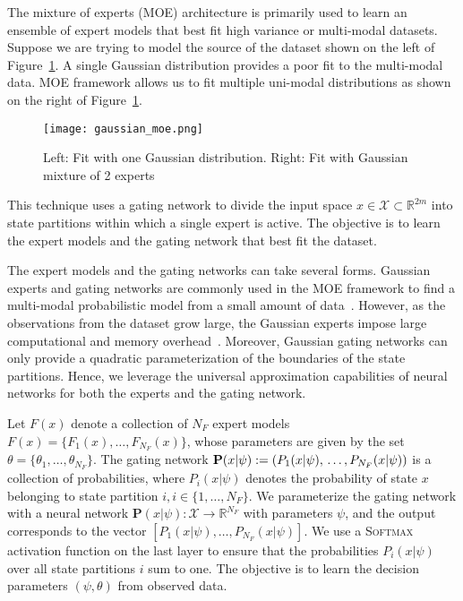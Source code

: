 The mixture of experts (MOE) architecture is primarily used to learn an ensemble
of expert models that best fit high variance or multi-modal datasets.
%
Suppose we are trying to model the source of the dataset shown on the left of
Figure~\ref{fig:gaussian_moe}.
%
A single Gaussian distribution provides a poor fit to the multi-modal data.
%
MOE framework allows us to fit multiple uni-modal distributions as shown on
the right of Figure~\ref{fig:gaussian_moe}.
\begin{figure}[tb]
  \centering
  \texttt{[image: gaussian\_moe.png]}
  \caption{Left: Fit with one Gaussian distribution. Right: Fit with Gaussian
  mixture of 2 experts~\cite{mcgonagle_dobre_pilling}}
  \label{fig:gaussian_moe}
\end{figure}
%
This technique uses a gating network to divide the input space $x \in
\mathcal{X} \subset \mathbb{R}^{2m}$ into state partitions within which a single
expert is active.
%
The objective is to learn the expert models and the gating network that
best fit the dataset.
%

The expert models and the gating networks can take several forms. 
%
Gaussian experts and gating networks are commonly used in the MOE framework to
find a multi-modal probabilistic model from a small amount of
data~\cite{bishop2006pattern}.
%
However, as the observations from the dataset grow large, the Gaussian experts
impose large computational and memory overhead~\cite{harkonen2022mixtures}.
%
Moreover, Gaussian gating networks can only provide a quadratic parameterization
of the boundaries of the state partitions.
%
Hence, we leverage the universal approximation capabilities of neural networks
for both the experts and the gating network.
%


Let $F(x)$ denote a collection of $N_F$ expert models $F(x) = \{F_1(x),
\dots, F_{N_{F}}(x)\}$, whose parameters are given by the set
$\theta=\{\theta_1, \dots, \theta_{N_{F}} \}$.
%
%
The gating network $\mathbf{P}(x| \psi) := (P_1(x| \psi), \\ \dots, P_{N_F}(x|
\psi))$ is a collection of probabilities, where $P_i(x | \psi)$ denotes the
probability of state $x$ belonging to state partition $i, i \in \{1, \dots, N_F \}$. 
%
We parameterize the gating network with a neural network $\mathbf{P}(x| \psi) :
\mathcal{X} \rightarrow \mathbb{R}^{N_F}$ with parameters $\psi$, and the output
corresponds to the vector $[P_1(x| \psi), \dots, P_{N_F}(x| \psi)]$.
%
We use a \textsc{Softmax} activation function on the last layer to ensure that the
probabilities $P_i(x | \psi)$ over all state partitions $i$ sum to one.
%
The objective is to learn the decision parameters $(\psi, \theta)$ from observed
data.

